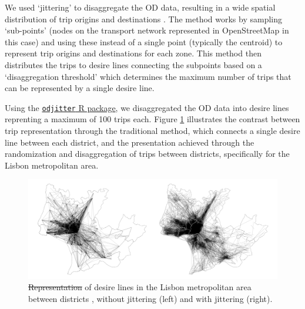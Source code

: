 \documentclass[review, doubleblind, 3p,
authoryear]{elsarticle} %
\providecommand{\DIFaddtex}[1]{{\protect\color{green}{#1}}} %
\providecommand{\DIFdeltex}[1]{{\protect\color{red}\sout{#1}}}                      %
\providecommand{\DIFaddbegin}{} %
\providecommand{\DIFaddend}{} %
\providecommand{\DIFaddFL}[1]{\DIFadd{#1}} %
\providecommand{\DIFdelFL}[1]{\DIFdel{#1}} %
\providecommand{\DIFaddbeginFL}{} %
\providecommand{\DIFaddendFL}{} %
\providecommand{\DIFdelbeginFL}{} %
\providecommand{\DIFdelendFL}{} %
\providecommand{\DIFadd}[1]{\texorpdfstring{\DIFaddtex{#1}}{#1}} %
\providecommand{\DIFdel}[1]{\texorpdfstring{\DIFdeltex{#1}}{}} %
\newcommand{\DIFscaledelfig}{0.5}
\newlength{\DIFdelgraphicswidth} %
\newlength{\DIFdelgraphicsheight} %
\newcommand{\DIFaddincludegraphics}[2][]{{\color{blue}\fbox{\DIFOincludegraphics[#1]{#2}}}} %
\newcommand{\DIFdelincludegraphics}[2][]{%
\sbox{\DIFdelgraphicsbox}{\DIFOincludegraphics[#1]{#2}}%
\settoboxwidth{\DIFdelgraphicswidth}{\DIFdelgraphicsbox} %
\settoboxtotalheight{\DIFdelgraphicsheight}{\DIFdelgraphicsbox} %
\scalebox{\DIFscaledelfig}{%
\parbox[b]{\DIFdelgraphicswidth}{\usebox{\DIFdelgraphicsbox}\\[-\baselineskip] \rule{\DIFdelgraphicswidth}{0em}}\llap{\resizebox{\DIFdelgraphicswidth}{\DIFdelgraphicsheight}{%
\setlength{\unitlength}{\DIFdelgraphicswidth}%
\begin{picture}(1,1)%
\thicklines\linethickness{2pt} %
{\color[rgb]{1,0,0}\put(0,0){\framebox(1,1){}}}%
{\color[rgb]{1,0,0}\put(0,0){\line( 1,1){1}}}%
{\color[rgb]{1,0,0}\put(0,1){\line(1,-1){1}}}%
\end{picture}%
}\hspace*{3pt}}} %
} %
\DeclareRobustCommand{\DIFaddbegin}{\DIFOaddbegin \let\includegraphics\DIFaddincludegraphics} %
\DeclareRobustCommand{\DIFaddend}{\DIFOaddend \let\includegraphics\DIFOincludegraphics} %
\DeclareRobustCommand{\DIFaddbeginFL}{\DIFOaddbeginFL \let\includegraphics\DIFaddincludegraphics} %
\DeclareRobustCommand{\DIFaddendFL}{\DIFOaddendFL \let\includegraphics\DIFOincludegraphics} %
\DeclareRobustCommand{\DIFdelbeginFL}{\DIFOdelbeginFL \let\includegraphics\DIFdelincludegraphics} %
\DeclareRobustCommand{\DIFdelendFL}{\DIFOaddendFL \let\includegraphics\DIFOincludegraphics} %
\begin{document}
We used `jittering' to disaggregate the OD data, resulting in a wide
spatial distribution of trip origins and destinations
\citep{Lovelace2022Jittering}. The method works by sampling `sub-points'
(nodes on the transport network represented in OpenStreetMap in this
case) and using these instead of a single point (typically the centroid)
to represent trip origins and destinations for each zone. This method
then distributes the trips to desire lines connecting the subpoints
based on a `disaggregation threshold' which determines the maximum
number of trips that can be represented by a single desire line.

Using the
\href{https://github.com/dabreegster/odjitter}{\texttt{odjitter} R
package}, we disaggregated the OD data into desire lines reprenting a
maximum of 100 trips each. Figure \ref{fig:jitter} illustrates the
contrast between trip representation through the traditional method,
which connects a single desire line between each district, and the
presentation achieved through the randomization and disaggregation of
trips between districts, specifically for the Lisbon metropolitan area.
\DIFaddbegin \DIFadd{As shown, the city of Lisbon (in the centre) is the main attractor of
trips, with a high number of trips to and from the other municipalities.
}\DIFaddend 

\begin{figure}

{\centering \DIFdelbeginFL %
\DIFdelendFL \DIFaddbeginFL \includegraphics[width=1\linewidth,]{img/jitter_cairo} 
\DIFaddendFL 

}

\caption{\DIFdelbeginFL \DIFdelFL{Representation }\DIFdelendFL \DIFaddbeginFL \DIFaddFL{Flow-weighted random sample }\DIFaddendFL of \DIFaddbeginFL \DIFaddFL{10,000 }\DIFaddendFL desire lines in the Lisbon metropolitan area between districts \DIFaddbeginFL \DIFaddFL{of the 18 municipalities}\DIFaddendFL , without jittering (left) and with jittering (right).}\label{fig:jitter}
\end{figure}
\end{document}
